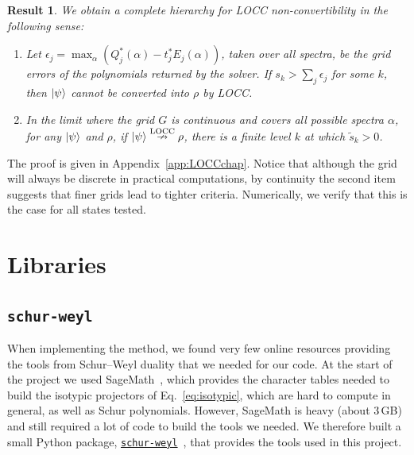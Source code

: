 \documentclass[11pt,a4paper]{report}
\renewcommand{\a}{\alpha}
\newtheorem{result}[theorem]{Result}
\newcounter{reptag}
\newif\iftags \tagsfalse   %
\newcommand{\reptagbox}[3]{\iftags\par\smallskip\noindent\refstepcounter{reptag}%
  \fcolorbox{#1}{#1!7}{\parbox{\dimexpr\linewidth-2\fboxsep-2\fboxrule\relax}{\small
  \textcolor{#1}{\textbf{[\thereptag]\ #2.}}\ #3}}\par\smallskip\fi}
\newcommand{\detail}[1]{\reptagbox{tagD}{More detail}{#1}}
\begin{document}
\begin{result}\label{thm:LOCC}
We obtain a complete hierarchy for LOCC non-convertibility in the following sense:
    \begin{enumerate}
    \item Let $\epsilon_j=\max_{\a}\left(Q^*_j(\a)-t^*_jE_j(\a)\right)$, taken over all spectra, be the grid errors of the polynomials returned by the solver.
    If $s_k>\sum_j\epsilon_j$ for some $k$, then $\ket{\psi}$ cannot be converted into $\rho$ by LOCC.
    \item In the limit where the grid $G$ is continuous and covers all possible spectra $\alpha$, for any $\ket{\psi}$ and $\rho$, if $\ket{\psi} \overset{\text{LOCC}}{\nrightarrow} \rho$, there is a finite level $k$ at which $\widetilde{s}_k > 0$.
    \end{enumerate}
\end{result}
The proof is given in Appendix~\ref{app:LOCCchap}. Notice that although the grid will always be discrete in practical computations, by continuity the second item suggests that finer grids lead to tighter criteria. Numerically, we verify that this is the case for all states tested.
\detail{Describe Fig.~\ref{fig:locc} in detail: the states and parameters, the region certified non-convertible, where extraction certified convertibility, and where neither test decides. Report how often the extraction succeeds, since the convertibility test is heuristic.}



\chapter{Libraries}\label{ch:libraries}
\section{\texttt{schur-weyl}}
When implementing the method, we found very few online resources providing the tools from Schur--Weyl duality that we needed for our code. At the start of the project we used SageMath~\cite{sagemath}, which provides the character tables needed to build the isotypic projectors of Eq.~\eqref{eq:isotypic}, which are hard to compute in general, as well as Schur polynomials. However, SageMath is heavy (about 3\,GB) and still required a lot of code to build the tools we needed.
We therefore built a small Python package, \href{https://github.com/AVlyx/schur-weyl}{\texttt{schur-weyl}}~\cite{schurWeyl}, that provides the tools used in this project.
\end{document}
